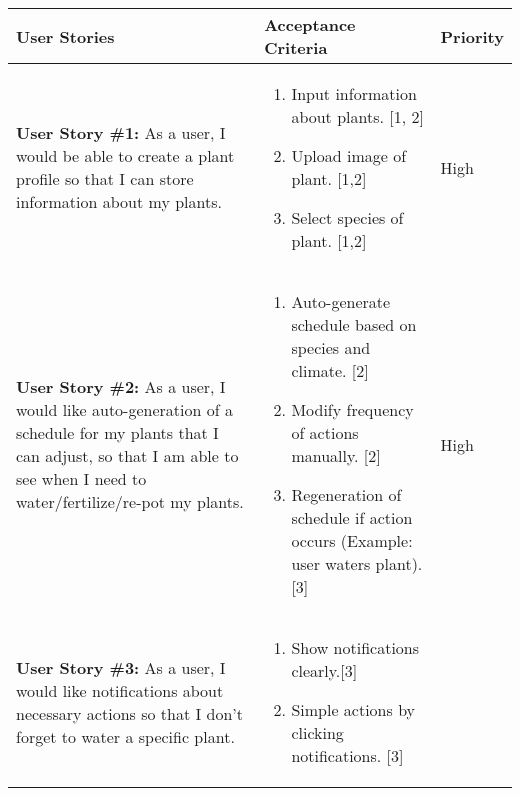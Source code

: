 \documentclass[portfolio.tex.tex]{subfiles}
\begin{document}
					\vspace{2cm}
					\begin{tabular}{p{6cm}|p{6cm}|p{4cm}}
						\large\textbf{User Stories} & \large \textbf{Acceptance Criteria \newline [Reference Sub Story]} &\large \textbf{ Priority} \\
						\hline
						\textbf{User Story \#1:} As a user, I would be able to create a plant profile so that I can store information about my plants.  &
						\vspace{-0.8cm}
						\begin{enumerate}
							\item  	Input information about plants. [1, 2]
							\item 	Upload image of plant. [1,2]
							\item 	Select species of plant. [1,2]
						\end{enumerate}&

						\vspace{-1cm}\color{red}High\\

						\textbf{User Story \#2:} As a user, I would like auto-generation of a schedule for my plants that I can adjust, so that I am able to see when I need to water/fertilize/re-pot my plants.  &

						\vspace{-0.8cm}
						\begin{enumerate}
							\item  	Auto-generate schedule based on species and climate. [2]
							\item 	Modify frequency of actions manually. [2]
							\item 	Regeneration of schedule if action occurs (Example: user waters plant). [3]
						\end{enumerate}&

						\vspace{-1cm}\color{red}High\\

						\textbf{User Story \#3:} As a user, I would like notifications about necessary actions so that I don't forget to water a specific plant.  &

						\vspace{-0.8cm}
						\begin{enumerate}
							\item  	Show notifications clearly.[3]
							\item 	Simple actions by clicking notifications. [3]
						\end{enumerate}&


\end{tabular}
\end{document}
